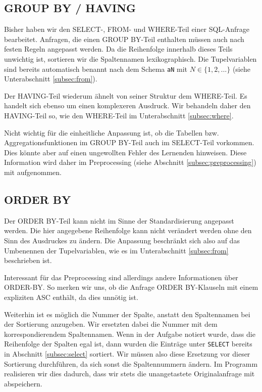 \subsection{GROUP BY / HAVING}

Bisher haben wir den SELECT-, FROM- und WHERE-Teil einer SQL-Anfrage bearbeitet. Anfragen, die einen GROUP BY-Teil enthalten müssen auch nach festen Regeln angepasst werden. Da die Reihenfolge innerhalb dieses Teils unwichtig ist, sortieren wir die Spaltennamen lexikographisch. Die Tupelvariablen sind bereits automatisch benannt nach dem Schema \verb|aN| mit $N\in \{1,2,...\}$ (siehe Unterabschnitt \ref{subsec:from}).

Der HAVING-Teil wiederum ähnelt von seiner Struktur dem WHERE-Teil. Es handelt sich ebenso um einen komplexeren Ausdruck. Wir behandeln daher den HAVING-Teil so, wie den WHERE-Teil im Unterabschnitt \ref{subsec:where}.

Nicht wichtig für die einheitliche Anpassung ist, ob die Tabellen bzw. Aggregationsfunktionen im GROUP BY-Teil auch im SELECT-Teil vorkommen. Dies könnte aber auf einen ungewollten Fehler des Lernenden hinweisen. Diese Information wird daher im Preprocessing (siehe Abschnitt \ref{subsec:preprocessing}) mit aufgenommen. 

\subsection{ORDER BY}

Der ORDER BY-Teil kann nicht im Sinne der Standardisierung angepasst werden. Die hier angegebene Reihenfolge kann nicht verändert werden ohne den Sinn des Ausdruckes zu ändern. Die Anpassung beschränkt sich also auf das Umbenennen der Tupelvariablen, wie es im Unterabschnitt \ref{subsec:from} beschrieben ist.

Interessant für das Preprocessing sind allerdings andere Informationen über ORDER-BY. So merken wir uns, ob die Anfrage ORDER BY-Klauseln mit einem expliziten ASC enthält, da dies unnötig ist.

Weiterhin ist es möglich die Nummer der Spalte, anstatt den Spaltennamen bei der Sortierung anzugeben. Wir ersetzten dabei die Nummer mit dem korrespondierendem Spaltennamen. Wenn in der Aufgabe notiert wurde, dass die Reihenfolge der Spalten egal ist, dann wurden die Einträge unter \verb|SELECT| bereits in Abschnitt \ref{subsec:select} sortiert. Wir müssen also diese Ersetzung vor dieser Sortierung durchführen, da sich sonst die Spaltennummern ändern. Im Programm realisieren wir dies dadurch, dass wir stets die unangetastete Originalanfrage mit abspeichern.

